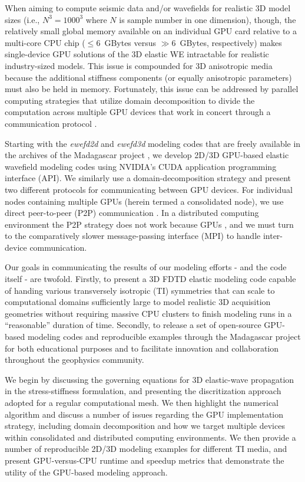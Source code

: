 When aiming to compute seismic data and/or wavefields for realistic 3D model sizes (i.e., $N^3=1000^3$ where $N$ is sample number in one dimension), though, the relatively small global memory available on an individual GPU card relative to a multi-core CPU chip ($\le6$~GBytes versus $\gg6$~GBytes, respectively) makes single-device GPU solutions of the 3D elastic WE intractable for realistic industry-sized models.  This issue is compounded for 3D anisotropic media because the additional stiffness components (or equally anisotropic parameters) must also be held in memory.  Fortunately, this issue can be addressed by parallel computing strategies that utilize domain decomposition to divide the computation across multiple GPU devices that work in concert through a communication protocol \cite[]{Micikevicius,Nakata}.

Starting with the {\it ewefd2d} and {\it ewefd3d} modeling codes that are freely available in the archives of the Madagascar project \cite[]{Madagascar}, we develop 2D/3D GPU-based elastic wavefield modeling codes using NVIDIA's CUDA application programming interface (API).  We similarly use a domain-decomposition strategy and present two different protocols for communicating between GPU devices.  For individual nodes containing multiple GPUs (herein termed a consolidated node), we use direct peer-to-peer (P2P) communication .  In a distributed computing environment the P2P strategy does not work because GPUs  , and we must turn to the comparatively slower message-passing interface (MPI) to handle inter-device communication.  

Our goals in communicating the results of our modeling efforts - and the code itself - are twofold.  Firstly, to present a 3D FDTD elastic modeling code capable of handing various transversely isotropic (TI) symmetries that can scale to computational domains sufficiently large to model realistic 3D acquisition geometries without requiring massive CPU clusters to finish modeling runs in a ``reasonable''  duration of time.  Secondly, to release a set of open-source GPU-based modeling codes and reproducible examples through the Madagascar project for both educational purposes and to facilitate innovation and collaboration throughout the geophysics community.

We begin by discussing the governing equations for 3D elastic-wave propagation in the stress-stiffness formulation, and presenting the discritization approach adopted for a regular computational mesh.  We then highlight the numerical algorithm and discuss a number of issues regarding the GPU implementation strategy, including domain decomposition and how we target multiple devices within consolidated and distributed computing environments.  We then provide a number of reproducible 2D/3D modeling examples for different TI media, and present GPU-versus-CPU runtime and speedup metrics that demonstrate the utility of the GPU-based modeling approach. 

